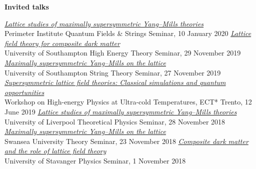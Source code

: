 \renewenvironment{spacelist} {
  \begin{list} {} {
    \setlength{\topsep}{-8 pt}
    \setlength{\itemsep}{5 pt}
    \setlength{\leftmargin}{-1.15 in}
  }
}{
  \end{list}
}

\raggedright
\vspace{12 pt}
\begin{spacelist}
  \item {\large \bfseries Invited talks}
  \begin{revnumerate}
  \setlength{\topsep}{-8 pt}
  \setlength{\itemsep}{10 pt}
  \setlength{\leftmargin}{0 mm}
    \pagebreakitem
      \textit{\href{http://www.davidschaich.net/talks/2001Perimeter.pdf}{Lattice studies of maximally supersymmetric Yang--Mills theories}} \\
      Perimeter Institute Quantum Fields \& Strings Seminar, 10 January 2020
    \pagebreakitem
      \textit{\href{http://www.davidschaich.net/talks/1911Soton_DM.pdf}{Lattice field theory for composite dark matter}} \\
      University of Southampton High Energy Theory Seminar, 29 November 2019
    \pagebreakitem
      \textit{\href{http://www.davidschaich.net/talks/1911Soton_susy.pdf}{Maximally supersymmetric Yang--Mills on the lattice}} \\
      University of Southampton String Theory Seminar, 27 November 2019
    \pagebreakitem
      \textit{\href{http://www.davidschaich.net/talks/1906ECT.pdf}{Supersymmetric lattice field theories: Classical simulations and quantum opportunities}} \\
      Workshop on High-energy Physics at Ultra-cold Temperatures, ECT* Trento, 12 June 2019
    \pagebreakitem
      \textit{\href{http://www.davidschaich.net/talks/1811Liverpool.pdf}{Lattice studies of maximally supersymmetric Yang--Mills theories}} \\
      University of Liverpool Theoretical Physics Seminar, 28 November 2018
    \pagebreakitem
      \textit{\href{http://www.davidschaich.net/talks/1811Swansea.pdf}{Maximally supersymmetric Yang--Mills on the lattice}} \\
      Swansea University Theory Seminar, 23 November 2018
    \pagebreakitem
      \textit{\href{http://www.davidschaich.net/talks/1811Stavanger.pdf}{Composite dark matter and the role of lattice field theory}} \\
      University of Stavanger Physics Seminar, 1 November 2018

\end{revnumerate}
\end{spacelist}
